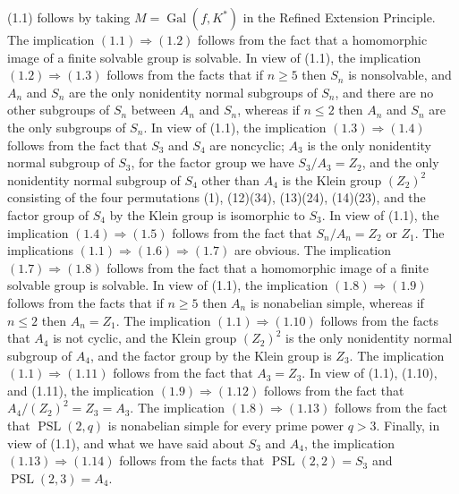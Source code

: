 (1.1) follows by taking $M=\operatorname{Gal}(f,K^*)$ in 
the Refined
Extension Principle. The implication $(1.1)\Rightarrow 
(1.2)$  
follows from the fact that a homomorphic image of a 
finite solvable group is solvable. In view of (1.1), the 
implication 
$(1.2)\Rightarrow (1.3)$ follows from the facts that if $ 
n\ge 5$ then 
$S_n$ is nonsolvable, and $A_n$ and $S_n$ are the only 
nonidentity 
normal subgroups of $S_n$, and there are no
other subgroups of $S_n$ between $A_n$ and $S_n$, whereas if
$n\le 2$ then $A_n$ and $S_n$ are the only subgroups of 
$S_n$. 
In view of (1.1), the implication $(1.3) \Rightarrow (1.4)$
follows from the fact that $S_3$ and $S_4$ are noncyclic;
$A_3$ is the only nonidentity normal subgroup of $S_3$, 
for the
factor group we have $S_3/A_3=Z_2$, and the only 
nonidentity normal
subgroup of $S_4$ other than $A_4$ is the Klein group 
$(Z_2)^2$
consisting of the four permutations (1), (12)(34), 
(13)(24), (14)(23),
and the factor group of $S_4$ by the Klein group is 
isomorphic
to $S_3$.  In view of (1.1), the implication $(1.4) 
\Rightarrow (1.5)$
follows from the fact that $S_n/A_n = Z_2$ or $Z_1$.
The implications $(1.1)\Rightarrow (1.6)\Rightarrow (1.7)$ 
are obvious. 
The implication 
$(1.7)\Rightarrow (1.8)$ follows from the fact that a 
homomorphic image of a 
finite solvable group is solvable. 
In view of (1.1), the implication $(1.8) \Rightarrow 
(1.9)$ follows from
the facts that if $n \ge 5$ then $A_n$ is nonabelian simple,
whereas if $n \leq 2$ then $A_n = Z_1$.  The implication 
$(1.1) \Rightarrow
(1.10)$ follows from the facts that $A_4$ is not cyclic, 
and the Klein
group $(Z_2)^2$ is the only nonidentity normal subgroup of 
$A_4$, and
the factor group by the Klein group is $Z_3$.  The 
implication
$(1.1) \Rightarrow (1.11)$ follows from the fact that $A_3 
= Z_3$.  In
view of (1.1), (1.10), and (1.11), the implication $(1.9) 
\Rightarrow (1.12)$
follows from the fact that $A_4/(Z_2)^2 = Z_3 = A_3$.  The 
implication
$(1.8) \Rightarrow (1.13)$ follows from the fact that 
$\operatorname{PSL}(2,q)$ is 
nonabelian simple for every prime power $q > 3$. Finally, 
in view
of (1.1), and what we have said about $S_3$ and $A_4$, the
implication $(1.13) \Rightarrow (1.14)$ follows from the 
facts
that $\operatorname{PSL}(2,2) = S_3$ and 
$\operatorname{PSL}(2,3) = A_4$.

